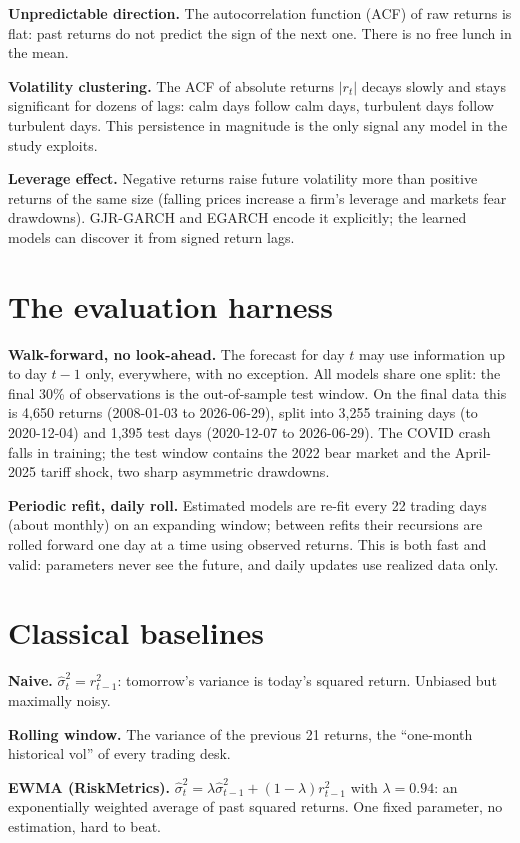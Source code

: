 \documentclass[a4paper,11pt]{article}
\newcommand{\term}[1]{\textbf{#1}}
\begin{document}
\term{Unpredictable direction.} The autocorrelation function (ACF) of raw returns is flat: past returns do not predict the sign of the next one. There is no free lunch in the mean.

\term{Volatility clustering.} The ACF of absolute returns $|r_t|$ decays slowly and stays significant for dozens of lags: calm days follow calm days, turbulent days follow turbulent days. This persistence in magnitude is the only signal any model in the study exploits.

\term{Leverage effect.} Negative returns raise future volatility more than positive returns of the same size (falling prices increase a firm's leverage and markets fear drawdowns). GJR-GARCH and EGARCH encode it explicitly; the learned models can discover it from signed return lags.

\section{The evaluation harness}

\term{Walk-forward, no look-ahead.} The forecast for day $t$ may use information up to day $t-1$ only, everywhere, with no exception. All models share one split: the final 30\% of observations is the out-of-sample test window. On the final data this is 4{,}650 returns (2008-01-03 to 2026-06-29), split into 3{,}255 training days (to 2020-12-04) and 1{,}395 test days (2020-12-07 to 2026-06-29). The COVID crash falls in training; the test window contains the 2022 bear market and the April-2025 tariff shock, two sharp asymmetric drawdowns.

\term{Periodic refit, daily roll.} Estimated models are re-fit every 22 trading days (about monthly) on an expanding window; between refits their recursions are rolled forward one day at a time using observed returns. This is both fast and valid: parameters never see the future, and daily updates use realized data only.

\section{Classical baselines}

\term{Naive.} $\hat\sigma_t^2=r_{t-1}^2$: tomorrow's variance is today's squared return. Unbiased but maximally noisy.

\term{Rolling window.} The variance of the previous 21 returns, the ``one-month historical vol'' of every trading desk.

\term{EWMA (RiskMetrics).} $\hat\sigma_t^2=\lambda\hat\sigma_{t-1}^2+(1-\lambda)r_{t-1}^2$ with $\lambda=0.94$: an exponentially weighted average of past squared returns. One fixed parameter, no estimation, hard to beat.
\end{document}
